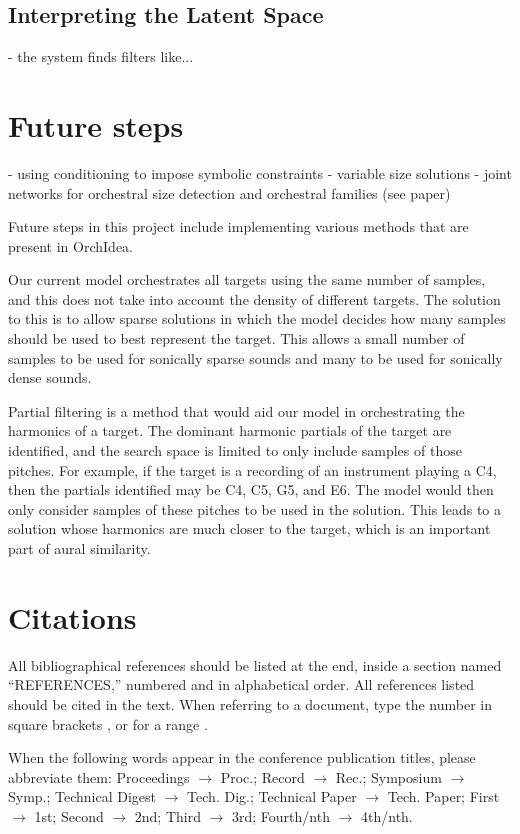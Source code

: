 \documentclass{article}
\begin{document}
\subsection{Interpreting the Latent Space}
- the system finds filters like...

\section{Future steps}
- using conditioning to impose symbolic constraints
- variable size solutions
- joint networks for orchestral size detection and orchestral families (see paper)

Future steps in this project include implementing various methods that are present in OrchIdea. 

Our current model orchestrates all targets using the same number of samples, and this does not take into account the density of different targets. The solution to this is to allow sparse solutions in which the model decides how many samples should be used to best represent the target. This allows a small number of samples to be used for sonically sparse sounds and many to be used for sonically dense sounds. 

Partial filtering is a method that would aid our model in orchestrating the harmonics of a target. The dominant harmonic partials of the target are identified, and the search space is limited to only include samples of those pitches. For example, if the target is a recording of an instrument playing a C4, then the partials identified may be C4, C5, G5, and E6. The model would then only consider samples of these pitches to be used in the solution. This leads to a solution whose harmonics are much closer to the target, which is an important part of aural similarity.

\section{Citations}

All bibliographical references should be listed at the end,
inside a section named ``REFERENCES,'' numbered and in alphabetical order.
All references listed should be cited in the text.
When referring to a document, type the number in square brackets
\cite{Author:00}, or for a range \cite{Author:00,Someone:10,Someone:04}.

When the following words appear in the conference publication titles, please abbreviate them: Proceedings $\rightarrow$ Proc.; Record $\rightarrow$ Rec.; Symposium $\rightarrow$ Symp.; Technical Digest $\rightarrow$ Tech. Dig.; Technical Paper $\rightarrow$ Tech. Paper; First $\rightarrow$ 1st; Second $\rightarrow$ 2nd; Third $\rightarrow$ 3rd; Fourth/nth $\rightarrow$ 4th/nth.
\end{document}
